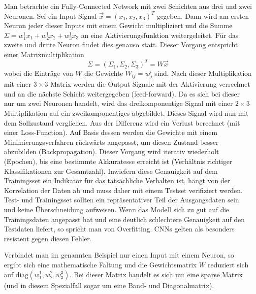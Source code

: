 		Man betrachte ein Fully-Connected Network mit zwei Schichten aus drei und zwei Neuronen. Sei ein Input Signal $\vec{x} = (x_1, x_2, x_3)^T$ gegeben. Dann wird am ersten Neuron jeder dieser Inputs mit einem Gewicht multipliziert und die Summe $\Sigma = w^1_1x_1 + w^1_2x_2 + w^1_3x_3$ an eine Aktivierungsfunktion weitergeleitet. Für das zweite und dritte Neuron findet dies genauso statt. Dieser Vorgang entspricht einer Matrixmultiplikation
		\begin{equation}
		\Sigma = (\Sigma_1, \Sigma_2, \Sigma_3)^T = W\vec{x}		
		\end{equation}
		wobei die Einträge von $W$ die Gewichte $W_{ij} = w^i_j$ sind. Nach dieser Multiplikation mit einer $3\times 3$ Matrix werden die Output Signale mit der Aktivierung verrechnet und an die nächste Schicht weitergegeben (feed-forward). Da es sich bei dieser nur um zwei Neuronen handelt, wird das dreikomponentige Signal mit einer $2\times 3$ Multiplikation auf ein zweikomponentiges abgebildet. Dieses Signal wird nun mit dem Sollzustand verglichen. Aus der Differenz wird ein Verlust berechnet (mit einer Loss-Function). Auf Basis dessen werden die Gewichte mit einem Minimierungsverfahren rückwärts angepasst, um diesen Zustand besser abzubilden (Backpropagation). Dieser Vorgang wird iterativ wiederholt (Epochen), bis eine bestimmte Akkuratesse erreicht ist (Verhältnis richtiger Klassifikationen zur Gesamtzahl). Inwiefern diese Genauigkeit auf dem Trainingsset ein Indikator für das tatsächliche Verhalten ist, hängt von der Korrelation der Daten ab und muss daher mit einem Testset verifiziert werden. Test- und Trainingsset sollten ein repräsentativer Teil der Ausgangsdaten sein und keine Überschneidung aufweisen. Wenn das Modell sich zu gut auf die Trainingsdaten angepasst hat und eine deutlich schlechtere Genauigkeit auf den Testdaten liefert, so spricht man von Overfitting. CNNs gelten als besonders resistent gegen diesen Fehler.
		
		Verbindet man im genannten Beispiel nur einen Input mit einem Neuron, so ergibt sich eine mathematische Faltung und die Gewichtsmatrix $W$ reduziert sich auf $\text{diag}(w^1_1, w^2_2, w^3_3)$. Bei dieser Matrix handelt es sich um eine sparse Matrix (und in diesem Spezialfall sogar um eine Band- und Diagonalmatrix).
		
